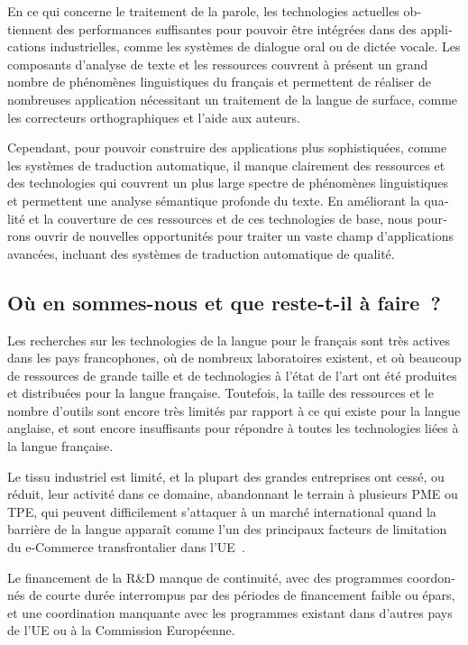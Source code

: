 \begin{french}
\begin{multicols}{2}
En ce qui concerne le traitement de la parole, les technologies
actuelles obtiennent des performances suffisantes pour pouvoir être
intégrées dans des applications industrielles, comme les systèmes de
dialogue oral ou de dictée vocale. Les composants d'analyse de texte et les
ressources couvrent à présent un grand nombre de phénomènes
linguistiques du français et permettent de réaliser de nombreuses
application nécessitant un traitement de la langue de surface,
comme les correcteurs orthographiques et l'aide aux auteurs.

Cependant, pour pouvoir construire des applications plus
sophistiquées, comme les systèmes de traduction automatique, il manque
clairement des ressources et des technologies qui couvrent un plus
large spectre de phénomènes linguistiques et permettent une analyse
sémantique profonde du texte. En améliorant la qualité et la
couverture de ces ressources et de ces technologies de base, nous
pourrons ouvrir de nouvelles opportunités pour traiter un vaste champ
d'applications avancées, incluant des systèmes de traduction
automatique de qualité.

\subsection{Où en sommes-nous et que reste-t-il à faire~?}

Les recherches sur les technologies de la langue pour le français sont très actives dans les pays francophones, où de nombreux laboratoires existent, et où beaucoup de ressources de
grande taille et de technologies à l'état de l'art ont été produites
et distribuées pour la langue française. Toutefois, la taille des
ressources et le nombre d'outils sont encore très limités par rapport
à ce qui existe pour la langue anglaise, et sont encore insuffisants
pour répondre à toutes les technologies liées à la langue française.

Le tissu industriel est limité, et la plupart des grandes entreprises
ont cessé, ou réduit, leur activité dans ce domaine, abandonnant le
terrain à plusieurs PME ou TPE, qui peuvent difficilement s'attaquer à
un marché international quand la barrière de la langue apparaît comme
l'un des principaux facteurs de limitation du {\mbox e-Commerce}
transfrontalier dans l'UE~\cite{euconclusion}.

Le financement de la R\&D manque de continuité, avec des programmes
coordonnés de courte durée interrompus par des périodes de financement
faible ou épars, et une coordination manquante avec les programmes
existant dans d'autres pays de l'UE ou à la Commission Européenne.


\end{multicols}
\end{french}
